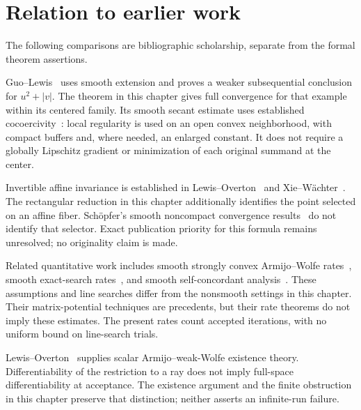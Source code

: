 \section*{Relation to earlier work}
The following comparisons are bibliographic scholarship, separate from the formal theorem assertions.

Guo--Lewis~\cite[Theorem~4.1 and Corollary~4.4]{GL18} uses smooth extension and proves a weaker subsequential conclusion for $u^2+|v|$. The theorem in this chapter gives full convergence for that example within its centered family. Its smooth secant estimate uses established cocoercivity~\cite[Theorem~2.5]{WW}: local regularity is used on an open convex neighborhood, with compact buffers and, where needed, an enlarged constant. It does not require a globally Lipschitz gradient or minimization of each original summand at the center.

Invertible affine invariance is established in Lewis--Overton~\cite[Section~2]{LO} and Xie--W\"achter~\cite[Theorem~II.1]{XW}. The rectangular reduction in this chapter additionally identifies the point selected on an affine fiber. Sch\"opfer's smooth noncompact convergence results~\cite[Theorems 3.4 and 3.7]{S16} do not identify that selector. Exact publication priority for this formula remains unresolved; no originality claim is made.

Related quantitative work includes smooth strongly convex Armijo--Wolfe rates~\cite{FND_JJM24AW}, smooth exact-search rates~\cite{FND_JJM26EX}, and smooth self-concordant analysis~\cite{FND_JM25}. These assumptions and line searches differ from the nonsmooth settings in this chapter. Their matrix-potential techniques are precedents, but their rate theorems do not imply these estimates. The present rates count accepted iterations, with no uniform bound on line-search trials.

Lewis--Overton~\cite[Theorem~4.5 and Proposition~4.11]{LO} supplies scalar Armijo--weak-Wolfe existence theory. Differentiability of the restriction to a ray does not imply full-space differentiability at acceptance. The existence argument and the finite obstruction in this chapter preserve that distinction; neither asserts an infinite-run failure.
